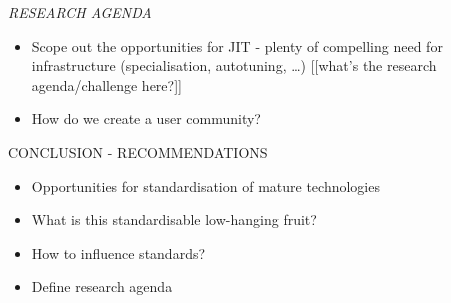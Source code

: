{\it
RESEARCH AGENDA
  \begin{itemize}
  \item Scope out the opportunities for JIT - plenty of compelling need for infrastructure (specialisation, autotuning, …) [[what’s the research agenda/challenge here?]]
  \item How do we create a user community?
  \end{itemize}

CONCLUSION - RECOMMENDATIONS
  \begin{itemize}
  \item Opportunities for standardisation of mature technologies
  \item What is this standardisable low-hanging fruit?
  \item How to influence standards?
  \item Define research agenda
  \end{itemize}
}


